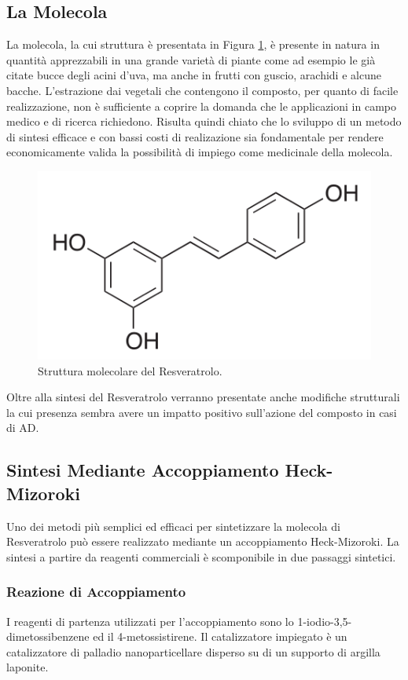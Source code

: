 \documentclass[a4paper, 12pt]{article}
\begin{document}
\subsection{La Molecola}
La molecola, la cui struttura è presentata in Figura \ref{fig:resveratrolo}, è presente in natura in quantità apprezzabili in una grande varietà di piante come ad esempio le già citate bucce degli acini d'uva, ma anche in frutti con guscio, arachidi e alcune bacche. L'estrazione dai vegetali che contengono il composto, per quanto di facile realizzazione, non è sufficiente a coprire la domanda che le applicazioni in campo medico e di ricerca richiedono. Risulta quindi chiato che lo sviluppo di un metodo di sintesi efficace e con bassi costi di realizazione sia fondamentale per rendere economicamente valida la possibilità di impiego come medicinale della molecola.
\begin{figure}[H]
	\centering
	\includegraphics[width=.5\linewidth]{immagini/resveratrolo.png}
	\caption{Struttura molecolare del Resveratrolo.}
	\label{fig:resveratrolo}
\end{figure}
Oltre alla sintesi del Resveratrolo verranno presentate anche modifiche strutturali la cui presenza sembra avere un impatto positivo sull'azione del composto in casi di AD.

\subsection{Sintesi Mediante Accoppiamento Heck-Mizoroki}
Uno dei metodi più semplici ed efficaci per sintetizzare la molecola di Resveratrolo può essere realizzato mediante un accoppiamento Heck-Mizoroki. La sintesi a partire da reagenti commerciali è scomponibile in due passaggi sintetici.

\subsubsection{Reazione di Accoppiamento}
I reagenti di partenza utilizzati per l'accoppiamento sono lo 1-iodio-3,5-dimetossibenzene ed il 4-metossistirene. Il catalizzatore impiegato è un catalizzatore di palladio nanoparticellare disperso su di un supporto di argilla laponite.
\end{document}

